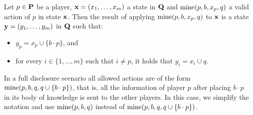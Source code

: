 Let $p \in \mathbf{P}$ be a player, $\mathbf{x} =  (x_1, \ldots, x_m)$ a state in $\mathbf{Q}$ and $\text{\rm mine}(p,b,x_p,q)$ a valid action of $p$ in state $\mathbf{x}$. Then the result of applying $\text{\rm mine}(p,b,x_p,q)$ to $\mathbf{x}$ is a state $\mathbf{y} = (y_1, \ldots, y_m)$ in $\mathbf{Q}$ such that:
\begin{itemize}
\item $y_p = x_p \cup \{b\cdot p\}$, and

\item for every $i \in \{1, \ldots, m\}$ such that $i \neq p$, it holds that $y_i = x_i \cup q$.
\end{itemize}
In a full disclosure scenario all allowed actions are of the form $\text{\rm mine}(p,b,q,q \cup \{b\cdot p\})$, that is, all the information of player $p$ after placing $b\cdot p$ in its body of knowledge is sent to the other players. In this case, we simplify the notation and use $\text{\rm mine}(p,b,q)$ instead of $\text{\rm mine}(p,b,q,q\cup \{b\cdot p\})$.

